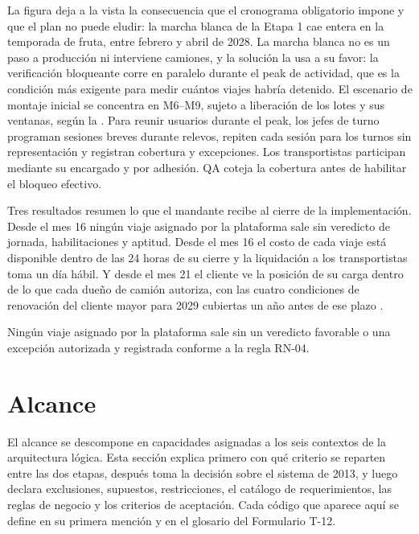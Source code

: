 La figura deja a la vista la consecuencia que el cronograma obligatorio impone y que el plan no puede
eludir: la marcha blanca de la Etapa 1 cae entera en la temporada de fruta, entre febrero y abril de
2028. La marcha blanca no es un paso a producción ni interviene camiones, y la solución la usa a su
favor: la verificación bloqueante corre en paralelo durante el peak de actividad, que es la condición
más exigente para medir cuántos viajes habría detenido. El escenario de montaje inicial se concentra en M6--M9, sujeto a liberación de los lotes y sus
ventanas, según la . Para reunir usuarios durante el peak, los jefes
de turno programan sesiones breves durante relevos, repiten cada sesión para los turnos sin
representación y registran cobertura y excepciones. Los transportistas participan mediante su
encargado y por adhesión. QA coteja la cobertura antes de habilitar el bloqueo efectivo.

Tres resultados resumen lo que el mandante recibe al cierre de la implementación. Desde el mes 16
ningún viaje asignado por la plataforma sale sin veredicto de jornada, habilitaciones y aptitud. Desde
el mes 16 el costo de cada viaje está disponible dentro de las 24 horas de su cierre y la liquidación a
los transportistas toma un día hábil. Y desde el mes 21 el cliente ve la posición de su carga dentro de
lo que cada dueño de camión autoriza, con las cuatro condiciones de renovación del cliente mayor para
2029 cubiertas un año antes de ese plazo .

\begin{compromiso}[metrica={Cero salidas con jornada, habilitación o equipo no apto desde el mes 16},
                   verifica={Criterio de aceptación 1 del Caso, auditoría mensual del total de asignaciones},
                   fuente={\caso{capítulo 18}{41}}]
Ningún viaje asignado por la plataforma sale sin un veredicto favorable o una excepción autorizada y registrada conforme a la regla RN-04.
\end{compromiso}

\section{Alcance}\label{sec:3-alcance}

El alcance se descompone en capacidades asignadas a los seis contextos de la arquitectura lógica. Esta
sección explica primero con qué criterio se reparten entre las dos etapas, después toma la decisión
sobre el sistema de 2013, y luego declara exclusiones, supuestos, restricciones, el catálogo de
requerimientos, las reglas de negocio y los criterios de aceptación. Cada código que aparece aquí se
define en su primera mención y en el glosario del Formulario T-12.

